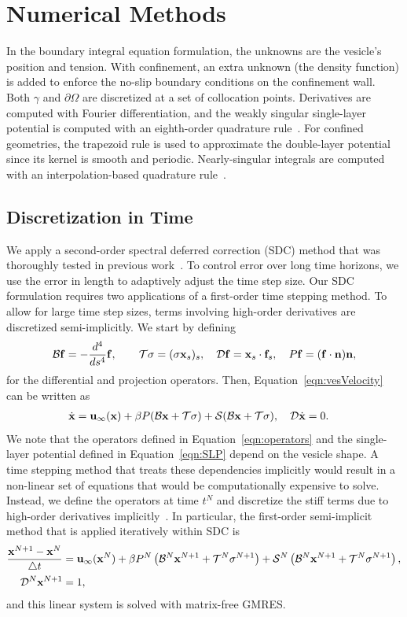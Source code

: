 \documentclass[prb,preprint,showpacs,preprintnumbers,amsmath,amssymb,longbibliography]{revtex4-1}
\begin{document}
\section{Numerical Methods}
\label{sec:numerics}
In the  boundary integral equation formulation, the unknowns are the
vesicle's position and tension. With confinement, an extra unknown (the
density function) is added to enforce the no-slip boundary conditions on
the confinement wall. Both $\gamma$ and $\partial\Omega$ are discretized
at a set of collocation points. Derivatives are computed with Fourier
differentiation, and the weakly singular single-layer potential is
computed with an eighth-order quadrature rule~\cite{alp1999}. For
confined geometries, the trapezoid rule is used to approximate the
double-layer potential since its kernel is smooth and periodic.
Nearly-singular integrals are computed with an interpolation-based
quadrature rule~\cite{qua-bir2014}.

\subsection{Discretization in Time}
We apply a second-order spectral deferred correction (SDC) method that
was thoroughly tested in previous work~\cite{qua-bir2016}. To control
error over long time horizons, we use the error in length to adaptively
adjust the time step size. Our SDC formulation requires two applications
of a first-order time stepping method. To allow for large time step
sizes, terms involving high-order derivatives are discretized
semi-implicitly. We start by defining
\begin{align}
  \mathcal{B}\mathbf{f} = -\frac{d^4}{ds^4} \mathbf{f},  \qquad
  \mathcal{T}\sigma = (\sigma \mathbf{x}_s)_s, \quad
  \mathcal{D}\mathbf{f} = \mathbf{x}_s \cdot \mathbf{f}_s, \quad
  P\mathbf{f} = (\mathbf{f} \cdot \mathbf{n}) \mathbf{n},
  \label{eqn:operators}
\end{align}
for the differential and projection operators. Then,
Equation~\eqref{eqn:vesVelocity} can be written as
\begin{align}
  \dot{\mathbf{x}} &= \mathbf{u}_\infty(\mathbf{x}) + \beta P(\mathcal{B}\mathbf{x} + \mathcal{T}\sigma)
  + \mathcal{S} (\mathcal{B}\mathbf{x} + \mathcal{T}\sigma), \quad \mathcal{D} \dot{\mathbf{x}} = 0.
\end{align}
We note that the operators defined in Equation~\eqref{eqn:operators} and
the single-layer potential defined in Equation~\eqref{eqn:SLP} depend on
the vesicle shape. A time stepping method that treats these dependencies
implicitly would result in a non-linear set of equations that would be
computationally expensive to solve. Instead, we define the operators at
time $t^N$ and discretize the stiff terms due to high-order derivatives
implicitly~\cite{vee-gue-zor-bir2009, qua-bir2014}. In particular, the
first-order semi-implicit method that is applied iteratively within SDC
is
\begin{alignat}{3}
  \frac{\mathbf{x}^{N+1} - \mathbf{x}^N}{\triangle t} &= \mathbf{u}_\infty(\mathbf{x}^N) 
  + \beta P^N\left(\mathcal{B}^N\mathbf{x}^{N+1} + \mathcal{T}^N\sigma^{N+1}\right) 
  + \mathcal{S}^N\left(\mathcal{B}^N\mathbf{x}^{N+1} + \mathcal{T}^N\sigma^{N+1}\right),  \\
  \mathcal{D}^N\mathbf{x}^{N+1} &= 1,
\end{alignat}
and this linear system is solved with matrix-free GMRES.
\end{document}
